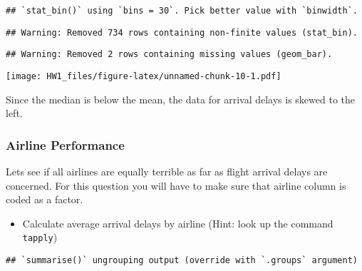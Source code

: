 \documentclass[
]{article}
\newenvironment{Shaded}{\begin{snugshade}}{\end{snugshade}}
\newcommand{\DataTypeTok}[1]{\textcolor[rgb]{0.13,0.29,0.53}{#1}}
\newcommand{\KeywordTok}[1]{\textcolor[rgb]{0.13,0.29,0.53}{\textbf{#1}}}
\newcommand{\NormalTok}[1]{#1}
\newcommand{\OperatorTok}[1]{\textcolor[rgb]{0.81,0.36,0.00}{\textbf{#1}}}
\newcommand{\OtherTok}[1]{\textcolor[rgb]{0.56,0.35,0.01}{#1}}
\newcommand{\StringTok}[1]{\textcolor[rgb]{0.31,0.60,0.02}{#1}}
\providecommand{\tightlist}{%
  \setlength{\itemsep}{0pt}\setlength{\parskip}{0pt}}
\begin{document}
\begin{verbatim}
## `stat_bin()` using `bins = 30`. Pick better value with `binwidth`.
\end{verbatim}

\begin{verbatim}
## Warning: Removed 734 rows containing non-finite values (stat_bin).
\end{verbatim}

\begin{verbatim}
## Warning: Removed 2 rows containing missing values (geom_bar).
\end{verbatim}

\texttt{[image: HW1\_files/figure-latex/unnamed-chunk-10-1.pdf]}

Since the median is below the mean, the data for arrival delays is
skewed to the left.

\hypertarget{airline-performance}{%
\subsubsection{Airline Performance}\label{airline-performance}}

Lets see if all airlines are equally terrible as far as flight arrival
delays are concerned. For this question you will have to make sure that
airline column is coded as a factor.

\begin{itemize}
\tightlist
\item
  Calculate average arrival delays by airline (Hint: look up the command
  \texttt{tapply})
\end{itemize}

\begin{Shaded}
\end{Shaded}

\begin{verbatim}
## `summarise()` ungrouping output (override with `.groups` argument)
\end{verbatim}
\end{document}

